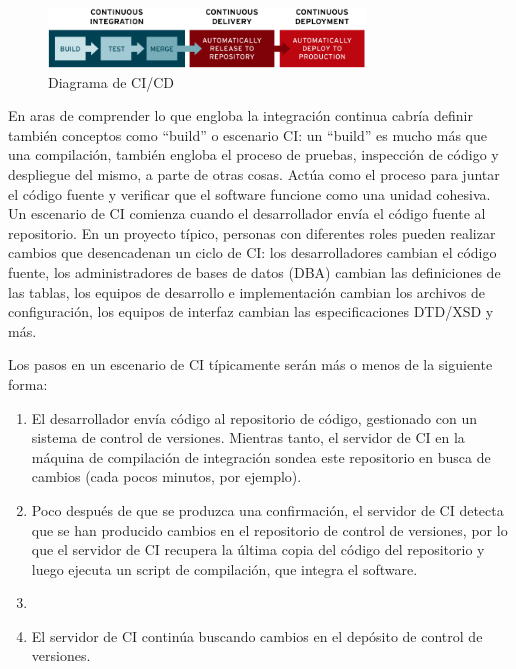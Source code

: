 \begin{figure}[h]
    \centering
    \includegraphics[width=0.75\textwidth,clip=true]{imgs/ci-cd-flow-desktop.png}
    \caption{Diagrama de CI/CD}
\end{figure}

En aras de comprender lo que engloba la integración continua cabría definir también conceptos como “build” o escenario CI: un “build” es mucho más que una compilación, también engloba el proceso de pruebas, inspección de código y despliegue del mismo, a parte de otras cosas. Actúa como el proceso para juntar el código fuente y verificar que el software funcione como una unidad cohesiva. Un escenario de CI comienza cuando el desarrollador envía el código fuente al repositorio. En un proyecto típico, {personas} con diferentes roles pueden realizar cambios que desencadenan un ciclo de CI: los desarrolladores cambian el código fuente, los administradores de bases de datos (DBA) cambian las definiciones de las tablas, los equipos de desarrollo e implementación cambian los archivos de configuración, los equipos de interfaz cambian las especificaciones DTD/XSD y más.

Los pasos en un escenario de CI típicamente serán más o menos de la siguiente forma:
\begin{enumerate}
    \item El desarrollador envía código al repositorio de código, gestionado con un sistema de control de versiones. 
    Mientras tanto, el servidor de CI en la máquina de compilación de integración sondea este repositorio en busca de cambios (cada pocos minutos, por ejemplo).
    \item Poco después de que se produzca una confirmación, el servidor de CI detecta que se han producido cambios en el repositorio de control de versiones, por lo que el servidor de CI recupera la última copia del código del repositorio y luego ejecuta un script de compilación, que integra el software. 
    \item {}
    \item El servidor de CI continúa buscando cambios en el depósito de control de versiones. 
\end{enumerate}

